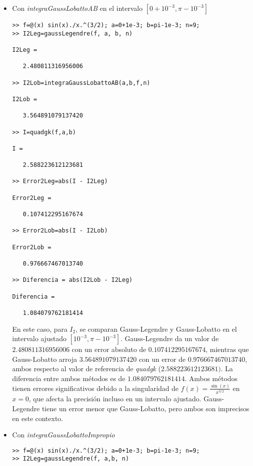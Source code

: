 \documentclass[a4paper]{article}
\begin{document}
\begin{itemize}
\begin{itemize}
    \item Con \textit{integraGaussLobattoAB} en el intervalo $[0+10^{-3},\pi-10^{-3}]$

\begin{lstlisting}[frame=single, style=Matlab-Pyglike]
>> f=@(x) sin(x)./x.^(3/2); a=0+1e-3; b=pi-1e-3; n=9;
>> I2Leg=gaussLegendre(f, a, b, n)

I2Leg =

   2.480811316956006

>> I2Lob=integraGaussLobattoAB(a,b,f,n)

I2Lob =

   3.564891079137420

>> I=quadgk(f,a,b)

I =

   2.588223612123681

>> Error2Leg=abs(I - I2Leg)

Error2Leg =

   0.107412295167674

>> Error2Lob=abs(I - I2Lob)

Error2Lob =

   0.976667467013740
   
>> Diferencia = abs(I2Lob - I2Leg)

Diferencia =

   1.084079762181414
\end{lstlisting}

En este caso, para \( I_2 \), se comparan Gauss-Legendre y Gauss-Lobatto  en el intervalo ajustado \( [10^{-3}, \pi - 10^{-3}] \). Gauss-Legendre da un valor de \( 2.480811316956006 \) con un error absoluto de \( 0.107412295167674 \), mientras que Gauss-Lobatto arroja \( 3.564891079137420 \) con un error de \( 0.976667467013740 \), ambos respecto al valor de referencia de \textit{quadgk} (\( 2.588223612123681 )\). La diferencia entre ambos métodos es de \( 1.084079762181414 \). Ambos métodos tienen errores significativos debido a la singularidad de \( f(x) = \frac{\sin(x)}{x^{3/2}} \) en \( x = 0 \), que afecta la precisión incluso en un intervalo ajustado. Gauss-Legendre tiene un error menor que Gauss-Lobatto, pero ambos son imprecisos en este contexto.
    
    \item Con \textit{integraGaussLobattoImpropio}
\begin{lstlisting}[frame=single, style=Matlab-Pyglike]
>> f=@(x) sin(x)./x.^(3/2); a=0+1e-3; b=pi-1e-3; n=9;
>> I2Leg=gaussLegendre(f, a,b, n)


\end{lstlisting}
\end{itemize}
\end{itemize}
\end{document}
